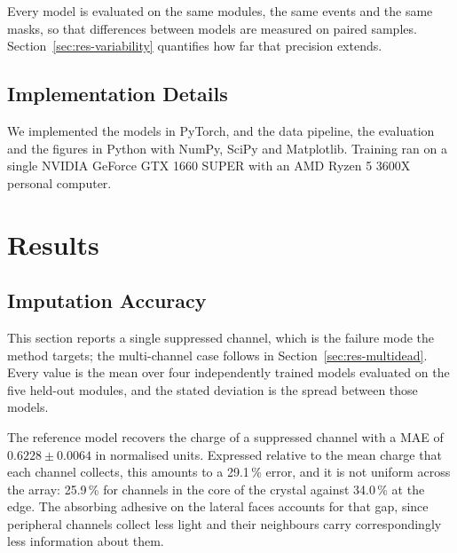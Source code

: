 \documentclass[10pt,conference]{IEEEtran}
\begin{document}
Every model is evaluated on the same modules, the same events and the same
masks, so that differences between models are measured on paired samples.
Section~\ref{sec:res-variability} quantifies how far that precision extends.

\subsection{Implementation Details}
\label{sec:implementation}

We implemented the models in PyTorch, and the data pipeline, the evaluation and
the figures in Python with NumPy, SciPy and Matplotlib. Training ran on a single
NVIDIA GeForce GTX 1660 SUPER with an AMD Ryzen 5 3600X personal computer.


\section{Results}
\label{sec:results}

\subsection{Imputation Accuracy}
\label{sec:res-accuracy}

This section reports a single suppressed channel, which is the failure mode the
method targets; the multi-channel case follows in
Section~\ref{sec:res-multidead}. Every value is the mean over four
independently trained models evaluated on the five held-out modules, and the
stated deviation is the spread between those models.

The reference model recovers the charge of a suppressed channel with a MAE of $0.6228 \pm 0.0064$ in normalised units. Expressed relative to
the mean charge that each channel collects, this amounts to a 29.1\,\% error,
and it is not uniform across the array: 25.9\,\% for channels in the core of the
crystal against 34.0\,\% at the edge. The absorbing adhesive on the lateral
faces accounts for that gap, since peripheral channels collect less light and
their neighbours carry correspondingly less information about them.
\end{document}
